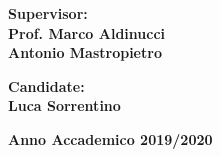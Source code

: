 \begin{titlepage}
\begin{minipage}[t]{0.47\textwidth}
{\large{\bf Supervisor:\\
Prof. Marco Aldinucci\\
Antonio Mastropietro}}
\end{minipage}
\hfill
\begin{minipage}[t]{0.47\textwidth}\raggedleft
{\large{\bf Candidate:\\
Luca Sorrentino}}
\end{minipage}
\vspace{10mm}
\begin{center}
\vspace{20mm}
{\large{\bf 
Anno Accademico 2019/2020}}
\end{center}

\end{titlepage}